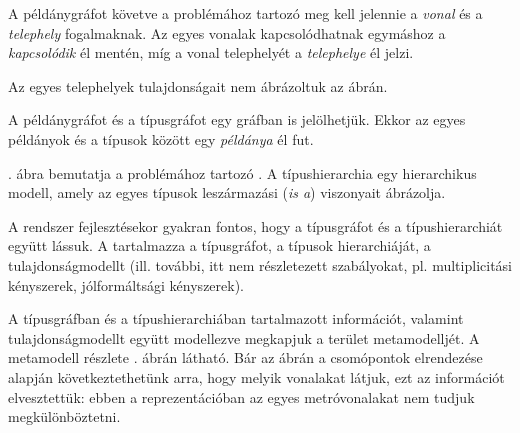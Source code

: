 
A példánygráfot követve a problémához tartozó  meg kell jelennie a \textit{vonal} és a \textit{telephely} fogalmaknak. Az egyes vonalak kapcsolódhatnak egymáshoz a \textit{kapcsolódik} él mentén, míg a vonal telephelyét a \textit{telephelye} él jelzi.

\begin{megjegyzes}
Az egyes telephelyek tulajdonságait nem ábrázoltuk az ábrán.
\end{megjegyzes}


A példánygráfot és a típusgráfot egy gráfban is jelölhetjük. Ekkor az egyes példányok és a típusok között egy \textit{példánya} él fut. %


. ábra bemutatja a problémához tartozó . A típushierarchia egy hierarchikus modell, amely az egyes típusok leszármazási (\textit{is a}) viszonyait ábrázolja.


A rendszer fejlesztésekor gyakran fontos, hogy a típusgráfot és a típushierarchiát együtt lássuk. A  tartalmazza a típusgráfot, a típusok hierarchiáját, a tulajdonságmodellt (ill. további, itt nem részletezett szabályokat, pl. multiplicitási kényszerek, jólformáltsági kényszerek). %

A típusgráfban és a típushierarchiában tartalmazott információt, valamint tulajdonságmodellt együtt modellezve megkapjuk a terület metamodelljét. A metamodell részlete . ábrán látható. Bár az ábrán a csomópontok elrendezése alapján következtethetünk arra, hogy melyik vonalakat látjuk, ezt az információt elvesztettük: ebben a reprezentációban az egyes metróvonalakat nem tudjuk megkülönböztetni.

